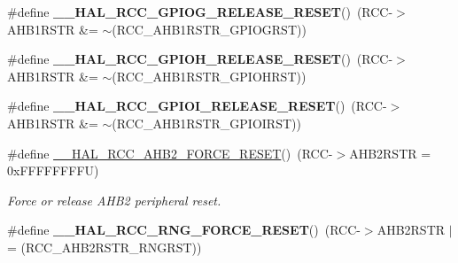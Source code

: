 \begin{DoxyCompactItemize}
\#define {\bfseries \+\_\+\+\_\+\+H\+A\+L\+\_\+\+R\+C\+C\+\_\+\+G\+P\+I\+O\+G\+\_\+\+R\+E\+L\+E\+A\+S\+E\+\_\+\+R\+E\+S\+ET}()~(R\+CC-\/$>$A\+H\+B1\+R\+S\+TR \&= $\sim$(R\+C\+C\+\_\+\+A\+H\+B1\+R\+S\+T\+R\+\_\+\+G\+P\+I\+O\+G\+R\+ST))
\item 
\mbox{\label{group___r_c_c_ex___force___release___peripheral___reset_gaaf11aa8bacb98c4e567bbaa58635acec}} 
\#define {\bfseries \+\_\+\+\_\+\+H\+A\+L\+\_\+\+R\+C\+C\+\_\+\+G\+P\+I\+O\+H\+\_\+\+R\+E\+L\+E\+A\+S\+E\+\_\+\+R\+E\+S\+ET}()~(R\+CC-\/$>$A\+H\+B1\+R\+S\+TR \&= $\sim$(R\+C\+C\+\_\+\+A\+H\+B1\+R\+S\+T\+R\+\_\+\+G\+P\+I\+O\+H\+R\+ST))
\item 
\mbox{\label{group___r_c_c_ex___force___release___peripheral___reset_ga7a6122d3d983a29c94568dd6229d897a}} 
\#define {\bfseries \+\_\+\+\_\+\+H\+A\+L\+\_\+\+R\+C\+C\+\_\+\+G\+P\+I\+O\+I\+\_\+\+R\+E\+L\+E\+A\+S\+E\+\_\+\+R\+E\+S\+ET}()~(R\+CC-\/$>$A\+H\+B1\+R\+S\+TR \&= $\sim$(R\+C\+C\+\_\+\+A\+H\+B1\+R\+S\+T\+R\+\_\+\+G\+P\+I\+O\+I\+R\+ST))
\item 
\mbox{\label{group___r_c_c_ex___force___release___peripheral___reset_gae82cd541f933be46ec8d6c3ea50d402c}} 
\#define \mbox{\hyperlink{group___r_c_c_ex___force___release___peripheral___reset_gae82cd541f933be46ec8d6c3ea50d402c}{\+\_\+\+\_\+\+H\+A\+L\+\_\+\+R\+C\+C\+\_\+\+A\+H\+B2\+\_\+\+F\+O\+R\+C\+E\+\_\+\+R\+E\+S\+ET}}()~(R\+CC-\/$>$A\+H\+B2\+R\+S\+TR = 0x\+F\+F\+F\+F\+F\+F\+F\+F\+U)
\begin{DoxyCompactList}\small\item\em Force or release A\+H\+B2 peripheral reset. \end{DoxyCompactList}\item 
\mbox{\label{group___r_c_c_ex___force___release___peripheral___reset_gad5f1fa1feca39e3aaa09aee9a14015b9}} 
\#define {\bfseries \+\_\+\+\_\+\+H\+A\+L\+\_\+\+R\+C\+C\+\_\+\+R\+N\+G\+\_\+\+F\+O\+R\+C\+E\+\_\+\+R\+E\+S\+ET}()~(R\+CC-\/$>$A\+H\+B2\+R\+S\+TR $\vert$= (R\+C\+C\+\_\+\+A\+H\+B2\+R\+S\+T\+R\+\_\+\+R\+N\+G\+R\+ST))
\item 
\mbox{\label{group___r_c_c_ex___force___release___peripheral___reset_gaaa1c3a6f5933e1a0c7335a20b34b6f4d}} 

\end{DoxyCompactItemize}
